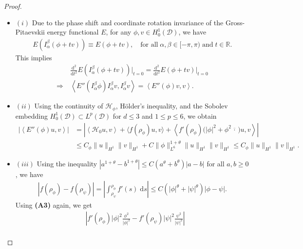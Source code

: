 \documentclass[preprint,3p]{elsarticle}
\begin{document}
\begin{proof}
	\begin{itemize}[label={},left=0pt]
		\item $(i)$ Due to the phase shift and coordinate rotation invariance of the Gross-Pitaevskii energy functional $E$, for any $\phi, v \in H_0^1(\mathcal{D})$, we have
		\begin{align*}
			E(I_{\alpha}^{\beta}(\phi + t v)) \equiv E(\phi + t v), \quad {\text{for all}}\; \alpha, \beta \in [-\pi, \pi) \; \text{and} \;  t \in \mathbb{R}.
		\end{align*}
		This implies
		\begin{align*}
			&\frac{\mathrm{d}^2}{\mathrm{d}t^2} E(I_{\alpha}^{\beta}(\phi + t v)) \Bigg|_{t=0} = \frac{\mathrm{d}^2}{\mathrm{d}t^2} E(\phi + t v) \Bigg|_{t=0} \\
			\Longrightarrow\ &\left\langle E''(I_{\alpha}^{\beta}\phi) I_{\alpha}^{\beta}v, I_{\alpha}^{\beta}v \right\rangle = \left\langle E''(\phi) v, v \right\rangle.
		\end{align*}
		\item $(ii)$ Using the continuity of $\mathcal{H}_{\phi}$, H\"older's inequality, and the Sobolev embedding $H_0^1(\mathcal{D}) \subset L^{p}(\mathcal{D})$ for $d \le 3$ and $1 \le p \le 6$, we obtain
	\begin{align*}
			\left|\left\langle E''(\phi)u, v\right\rangle\right|
			&= \left|\left\langle\mathcal{H}_{0}u, v\right\rangle + \big\langle f(\rho_{\phi})u, v\big\rangle + \left\langle f'(\rho_{\phi})\big(|\phi|^2 + \phi^2 \overline{\,\cdot\,}\big)u, v\right\rangle\right| \\
			&\le C_{\phi}\|u\|_{H^1}\|v\|_{H^1} + C\|\phi\|^{1+\theta}_{L^{6}}\|u\|_{H^1}\|v\|_{H^1} \le C_{\phi}\|u\|_{H^1}\|v\|_{H^1}.
		\end{align*}
		\item $(iii)$ Using the inequality $|a^{1+\theta}-b^{1+\theta}|\le C(a^{\theta}+b^{\theta})|a-b|$ for all $a,b\ge0$, we have
		\begin{align}\label{f-continu}
			\left|f(\rho_{\phi})-f(\rho_{\psi})\right|=\left|\int_{\rho_{\psi}}^{\rho_{\phi}}f'(s)\;\text{d}s\right|\le C\left(|\phi|^{\theta}+|\psi|^{\theta}\right)|\phi-\psi|.
		\end{align}
		Using {\bf (A3)} again, we get
		\begin{align}\label{f'-continu}
			\nonumber&\left|f'(\rho_{\phi})|\phi|^2\frac{\phi^2}{|\phi|^2}-f'(\rho_{\psi})|\psi|^2\frac{\psi^2}{|\psi|^2}\right|\\

\end{align}
\end{itemize}
\end{proof}
\end{document}
